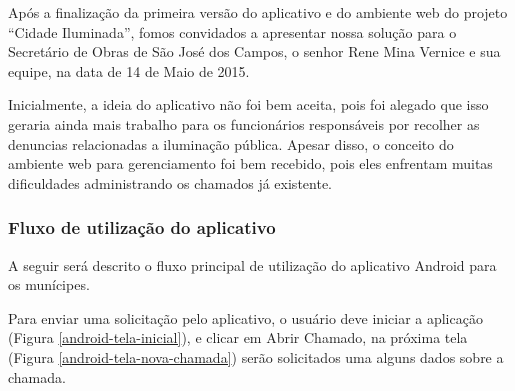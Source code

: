 \documentclass[
	article,			%
	11pt,				%
	oneside,			%
	a4paper,			%
	english,			%
	brazil,				%
	sumario=tradicional
	]{abntex2}
\begin{document}
Após a finalização da primeira versão do aplicativo e do ambiente web do
projeto “Cidade Iluminada”, fomos convidados a apresentar nossa solução para o
Secretário de Obras de São José dos Campos, o senhor Rene Mina Vernice e sua
equipe, na data de 14 de Maio de 2015.

Inicialmente, a ideia do aplicativo não foi bem aceita, pois foi alegado que
isso geraria ainda mais trabalho para os funcionários responsáveis por
recolher as denuncias relacionadas a iluminação pública. Apesar disso, o
conceito do ambiente web para gerenciamento foi bem recebido, pois eles
enfrentam muitas dificuldades administrando os chamados já existente.

\subsubsection{Fluxo de utilização do aplicativo}

A seguir será descrito o fluxo principal de utilização do aplicativo Android para os munícipes.

Para enviar uma solicitação pelo aplicativo, o usuário deve iniciar a aplicação (Figura
\ref{android-tela-inicial}), e clicar em Abrir Chamado, na próxima tela (Figura
\ref{android-tela-nova-chamada}) serão solicitados uma alguns dados sobre a chamada.
\end{document}
